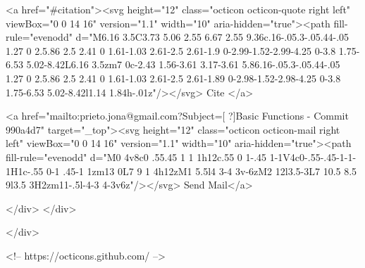       <a  href="#citation"><svg height="12" class="octicon octicon-quote right left" viewBox="0 0 14 16" version="1.1" width="10" aria-hidden="true"><path fill-rule="evenodd" d="M6.16 3.5C3.73 5.06 2.55 6.67 2.55 9.36c.16-.05.3-.05.44-.05 1.27 0 2.5.86 2.5 2.41 0 1.61-1.03 2.61-2.5 2.61-1.9 0-2.99-1.52-2.99-4.25 0-3.8 1.75-6.53 5.02-8.42L6.16 3.5zm7 0c-2.43 1.56-3.61 3.17-3.61 5.86.16-.05.3-.05.44-.05 1.27 0 2.5.86 2.5 2.41 0 1.61-1.03 2.61-2.5 2.61-1.89 0-2.98-1.52-2.98-4.25 0-3.8 1.75-6.53 5.02-8.42l1.14 1.84h-.01z"/></svg> Cite
      </a>

      <a href="mailto:prieto.jona@gmail.com?Subject=[ ?]Basic Functions - Commit 990a4d7" target="_top"><svg height="12" class="octicon octicon-mail right left" viewBox="0 0 14 16" version="1.1" width="10" aria-hidden="true"><path fill-rule="evenodd" d="M0 4v8c0 .55.45 1 1 1h12c.55 0 1-.45 1-1V4c0-.55-.45-1-1-1H1c-.55 0-1 .45-1 1zm13 0L7 9 1 4h12zM1 5.5l4 3-4 3v-6zM2 12l3.5-3L7 10.5 8.5 9l3.5 3H2zm11-.5l-4-3 4-3v6z"/></svg> Send Mail</a>

    </div>
  </div>

</div>

<!-- https://octicons.github.com/ -->





